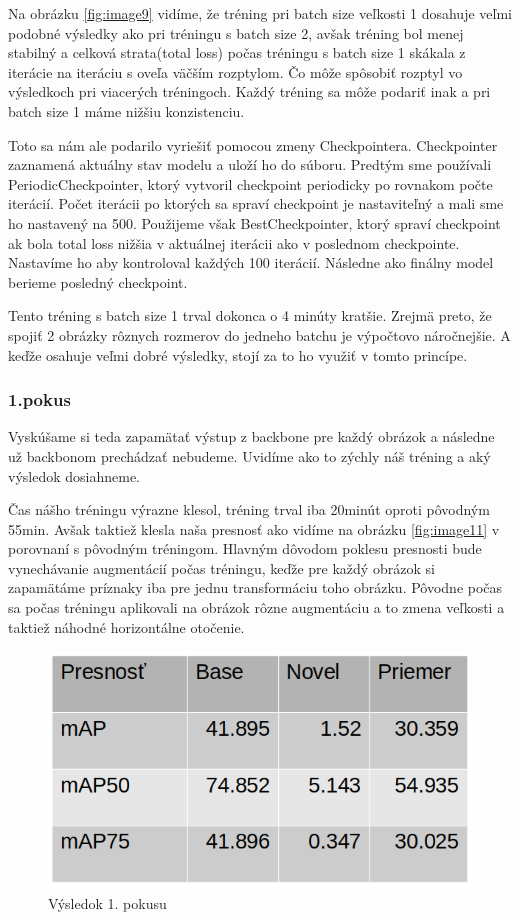 Na obrázku \ref{fig:image9} vidíme, že tréning pri batch size veľkosti 1 dosahuje veľmi podobné výsledky ako pri tréningu s batch size 2, avšak tréning bol menej stabilný a celková strata(total loss) počas tréningu s batch size 1 skákala z iterácie na iteráciu s oveľa väčším rozptylom. Čo môže spôsobiť rozptyl vo výsledkoch pri viacerých tréningoch. Každý tréning sa môže podariť inak a pri batch size 1 máme nižšiu konzistenciu. 

Toto sa nám ale podarilo vyriešiť pomocou zmeny Checkpointera. Checkpointer zaznamená aktuálny stav modelu a uloží ho do súboru. Predtým sme používali PeriodicCheckpointer, ktorý vytvoril checkpoint periodicky po rovnakom počte iterácií. Počet iterácii po ktorých sa spraví checkpoint je nastaviteľný a mali sme ho nastavený na 500. Použijeme však BestCheckpointer, ktorý spraví checkpoint ak bola total loss nižšia v aktuálnej iterácii ako v poslednom checkpointe. Nastavíme ho aby kontroloval každých 100 iterácií. Následne ako finálny model berieme posledný checkpoint. 

Tento tréning s batch size 1 trval dokonca o 4 minúty kratšie. Zrejmä preto, že spojiť 2 obrázky rôznych rozmerov do jedneho batchu je výpočtovo náročnejšie. A keďže osahuje veľmi dobré výsledky, stojí za to ho využiť v tomto princípe. 

\subsubsection{1.pokus}

Vyskúšame si teda zapamätať výstup z backbone pre každý obrázok a následne už backbonom prechádzať nebudeme. Uvidíme ako to zýchly náš tréning a aký výsledok dosiahneme. 

Čas nášho tréningu výrazne klesol, tréning trval iba 20minút oproti pôvodným 55min. Avšak taktiež klesla naša presnosť ako vidíme na obrázku \ref{fig:image11} v porovnaní s pôvodným tréningom. Hlavným dôvodom poklesu presnosti bude vynechávanie augmentácií počas tréningu, keďže pre každý obrázok si zapamätáme príznaky iba pre jednu transformáciu toho obrázku. Pôvodne počas sa počas tréningu aplikovali na obrázok rôzne augmentáciu a to zmena veľkosti a taktiež náhodné horizontálne otočenie. 

\begin{figure}[H]
\centering
\includegraphics[width=\textwidth]{images/faster_1attempt_table.png}
\caption{Výsledok 1. pokusu}
\label{fig:image10}
\end{figure}

